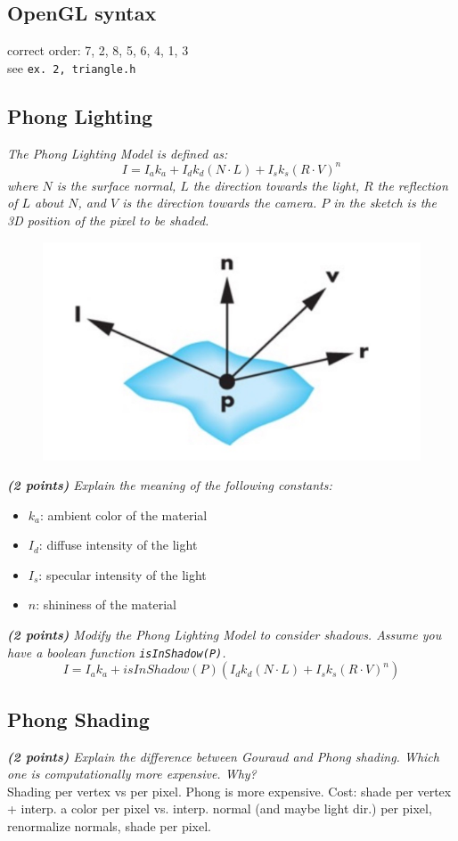\documentclass[a4paper,10pt]{article}
\begin{document}
\subsection{OpenGL syntax}
correct order: 
7, 2, 8, 5, 6, 4, 1, 3\\
see \texttt{ex. 2, triangle.h}
\subsection{Phong Lighting}
\textit{The Phong Lighting Model is defined as:}
\[I=I_ak_a+I_dk_d(N\cdot L)+I_sk_s(R\cdot V)^n\]
\textit{where  $N$  is  the  surface  normal,  $L$  the  direction  towards  the  light,  $R$  the  reflection  of  $L$  about  $N$,  and  $V$  is  the  direction  towards  the  camera. $P$ in the sketch is the 3D position of the pixel to be shaded.}\\
\begin{figure}[H]
	\centering
	\includegraphics[width=.3\textwidth]{4-3-phong}
\end{figure}

\textit{\textbf{(2 points)} Explain the meaning of the following constants:}
\begin{itemize}
	\item $k_a$: ambient color of the material
	\item $I_d$: diffuse intensity of the light
	\item $I_s$: specular intensity of the light
	\item $n$: shininess of the material
\end{itemize}
 \textit{\textbf{(2 points)} Modify the Phong Lighting Model to consider shadows.  Assume you 
have a boolean function \texttt{isInShadow(P)}.}
\[I = I_ak_a + isInShadow(P)(I_d k_d (N \cdot L) + I_sk_s(R \cdot V )^n)\]

\subsection{Phong Shading}
\textit{\textbf{(2 points)} Explain the difference between Gouraud and Phong shading. Which one is computationally more expensive. Why?}\\

Shading per vertex vs per pixel.  Phong is more expensive.  Cost:  shade per vertex + interp. a color per pixel vs.  interp. normal (and maybe light dir.) per pixel, renormalize normals,  shade per pixel.
\end{document}
